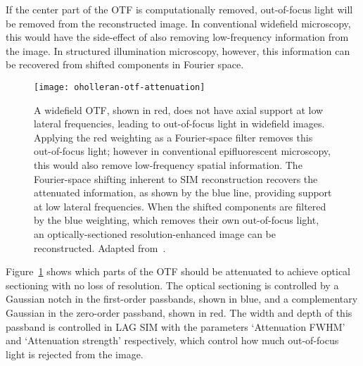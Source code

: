 If the center part of the OTF is computationally removed, out-of-focus light will be removed from the reconstructed image.
In conventional widefield microscopy, this would have the side-effect of also removing low-frequency information from the image.
In structured illumination microscopy, however, this information can be recovered from shifted components in Fourier space.

\begin{figure}[htbp!]
\centering
\texttt{[image: oholleran-otf-attenuation]}
\caption[LAG SIM: OTF attenuation as part of the SIM reconstruction process removes out-of-focus light]{A widefield OTF, shown in red, does not have axial support at low lateral frequencies, leading to out-of-focus light in widefield images. Applying the red weighting as a Fourier-space filter removes this out-of-focus light; however in conventional epifluorescent microscopy, this would also remove low-frequency spatial information. The Fourier-space shifting inherent to SIM reconstruction recovers the attenuated information, as shown by the blue line, providing support at low lateral frequencies. When the shifted components are filtered by the blue weighting, which removes their own out-of-focus light, an optically-sectioned resolution-enhanced image can be reconstructed.  Adapted from~\cite{oholleran2014optimized}. }
\label{fig:oholleran-otf}
\end{figure}

Figure~\ref{fig:oholleran-otf} shows which parts of the OTF should be attenuated to achieve optical sectioning with no loss of resolution.
The optical sectioning is controlled by a Gaussian notch in the first-order passbands, shown in blue, and a complementary Gaussian in the zero-order passband, shown in red.
The width and depth of this passband is controlled in LAG SIM with the parameters `Attenuation FWHM' and `Attenuation strength' respectively, which control how much out-of-focus light is rejected from the image.

